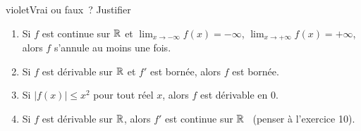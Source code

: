 \begin{exo}{violet}{Vrai ou faux~? Justifier \demo\ }
\begin{enumerate}
  \item Si $f$ est continue sur $\mathbb{R}$ et $\displaystyle\lim_{x\to-\infty}f(x)=-\infty$, $\displaystyle\lim_{x\to+\infty}f(x)=+\infty$, alors $f$ s'annule au moins une fois.
  \item Si $f$ est dérivable sur $\mathbb{R}$ et $f'$ est bornée, alors $f$ est bornée.
  \item Si $|f(x)|\leq x^2$ pour tout réel $x$, alors $f$ est dérivable en $0$.
  \item Si $f$ est dérivable sur $\mathbb{R}$, alors $f'$ est continue sur $\mathbb{R}$ \ {\small(penser à l'exercice 10)}.
\end{enumerate}
\end{exo}


